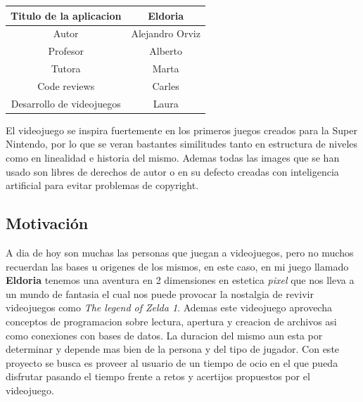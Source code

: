 \documentclass[a4paper]{article}
\begin{document}
\begin{center}
    \begin{tabular}{| c | c |}
        \hline
        Titulo de la aplicacion   & Eldoria         \\ \hline
        Autor                     & Alejandro Orviz \\ \hline
        Profesor                  & Alberto         \\ \hline
        Tutora                    & Marta           \\ \hline
        Code reviews              & Carles          \\ \hline
        Desarrollo de videojuegos & Laura           \\ \hline
    \end{tabular}
\end{center}

El videojuego se inspira fuertemente en los primeros juegos creados para la Super Nintendo, por lo que se veran bastantes similitudes tanto en estructura de niveles
como en linealidad e historia del mismo. Ademas todas las images que se han usado son libres de derechos de autor o en su defecto creadas con inteligencia artificial para evitar problemas de copyright.

\clearpage
\subsection{Motivación}
A dia de hoy son muchas las personas que juegan a videojuegos, pero no muchos recuerdan las bases u origenes de los mismos, en este caso, en mi juego llamado
\textbf{Eldoria} tenemos una aventura en 2 dimensiones en estetica \textit{pixel} que nos lleva a un mundo de fantasia el cual nos puede provocar la nostalgia de revivir
videojuegos como \textit{The legend of Zelda 1}. Ademas este videojuego aprovecha conceptos de programacion sobre lectura, apertura y creacion de archivos asi como
conexiones con bases de datos. La duracion del mismo aun esta por determinar y depende mas bien de la persona y del tipo de jugador. Con este proyecto se busca
es proveer al usuario de un tiempo de ocio en el que pueda disfrutar pasando el tiempo frente a retos y acertijos propuestos por el videojuego.
\end{document}
